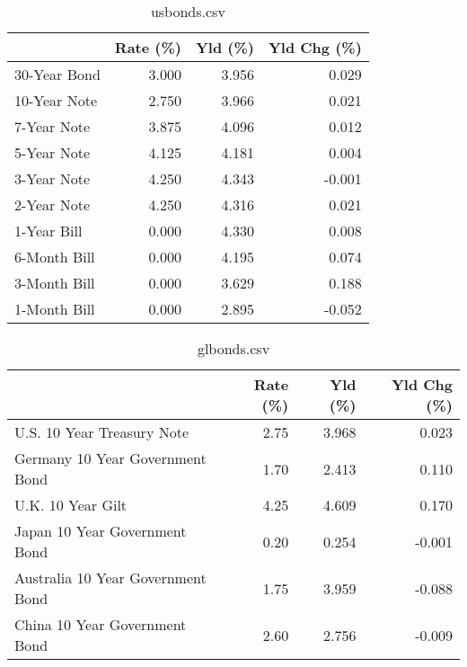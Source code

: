\documentclass{article}%
\begin{document}
%


\begin{table}[htbp]%
\caption{usbonds.csv}%
\centering%
\begin{adjustbox}{width=1\textwidth}%
\begin{tabular}{lrrr}
\toprule
             &  Rate (\%) &  Yld (\%) &  Yld Chg (\%) \\
\midrule
30-Year Bond &     3.000 &    3.956 &        0.029 \\
10-Year Note &     2.750 &    3.966 &        0.021 \\
 7-Year Note &     3.875 &    4.096 &        0.012 \\
 5-Year Note &     4.125 &    4.181 &        0.004 \\
 3-Year Note &     4.250 &    4.343 &       -0.001 \\
 2-Year Note &     4.250 &    4.316 &        0.021 \\
 1-Year Bill &     0.000 &    4.330 &        0.008 \\
6-Month Bill &     0.000 &    4.195 &        0.074 \\
3-Month Bill &     0.000 &    3.629 &        0.188 \\
1-Month Bill &     0.000 &    2.895 &       -0.052 \\
\bottomrule
\end{tabular}
%
\end{adjustbox}%
\end{table}

%


\begin{table}[htbp]%
\caption{glbonds.csv}%
\centering%
\begin{adjustbox}{width=1\textwidth}%
\begin{tabular}{lrrr}
\toprule
                                  &  Rate (\%) &  Yld (\%) &  Yld Chg (\%) \\
\midrule
       U.S. 10 Year Treasury Note &      2.75 &    3.968 &        0.023 \\
  Germany 10 Year Government Bond &      1.70 &    2.413 &        0.110 \\
                U.K. 10 Year Gilt &      4.25 &    4.609 &        0.170 \\
    Japan 10 Year Government Bond &      0.20 &    0.254 &       -0.001 \\
Australia 10 Year Government Bond &      1.75 &    3.959 &       -0.088 \\
    China 10 Year Government Bond &      2.60 &    2.756 &       -0.009 \\
\bottomrule
\end{tabular}
%
\end{adjustbox}%
\end{table}
\end{document}
